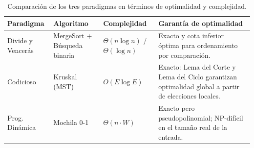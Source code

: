 \documentclass[11pt, a4paper]{article}
\begin{document}
\begin{table}[h!]
\centering\small
\begin{tabularx}{\textwidth}{
  >{\raggedright\arraybackslash}p{2cm}
  >{\raggedright\arraybackslash}p{2.4cm}
  >{\raggedright\arraybackslash}p{2.8cm}
  >{\raggedright\arraybackslash}X
}
\toprule
\textbf{Paradigma} & \textbf{Algoritmo} & \textbf{Complejidad} & \textbf{Garantía de optimalidad} \\
\midrule
Divide y Vencerás & MergeSort + Búsqueda binaria & $\Theta(n\log n)$ / $\Theta(\log n)$ &
  Exacto y cota inferior óptima para ordenamiento por comparación. \\
Codicioso & Kruskal (MST) & $O(E\log E)$ &
  Exacto: Lema del Corte y Lema del Ciclo garantizan optimalidad global a partir de elecciones locales. \\
Prog. Dinámica & Mochila 0-1 & $\Theta(n\cdot W)$ &
  Exacto pero pseudopolinomial; NP-difícil en el tamaño real de la entrada. \\
\bottomrule
\end{tabularx}
\caption{Comparación de los tres paradigmas en términos de optimalidad y complejidad.}
\end{table}
\end{document}
